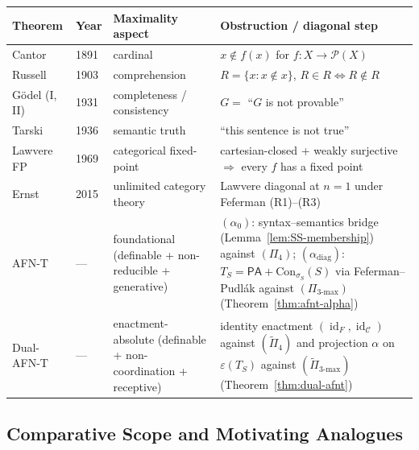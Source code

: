\documentclass[11pt]{article}
\theoremstyle{plain}
\theoremstyle{definition}
\newcommand{\cC}{\mathcal{C}}
\newcommand{\cP}{\mathcal{P}}
\newcommand{\Con}{\mathrm{Con}}
\newcommand{\PA}{\mathsf{PA}}
\DeclareMathOperator{\id}{id}
\begin{document}
\begin{center}
\begin{tabular}{@{}l l p{3.2cm} p{5.7cm}@{}}
\toprule
Theorem & Year & Maximality aspect & Obstruction / diagonal step \\ \midrule
Cantor~\cite{Cantor1891} & 1891 & cardinal & $x \notin f(x)$ for $f : X \to \cP(X)$ \\
Russell~\cite{Russell1903} & 1903 & comprehension & $R = \{x : x \notin x\}$, $R \in R \iff R \notin R$ \\
G\"odel (I, II)~\cite{Godel1931} & 1931 & completeness / consistency & $G = $ ``$G$ is not provable'' \\
Tarski~\cite{Tarski1936} & 1936 & semantic truth & ``this sentence is not true'' \\
Lawvere FP~\cite{Lawvere1969} & 1969 & categorical fixed-point & cartesian-closed + weakly surjective $\Rightarrow$ every $f$ has a fixed point \\
Ernst~\cite{Ernst2015} & 2015 & unlimited category theory & Lawvere diagonal at $n = 1$ under Feferman (R1)--(R3) \\
AFN-T & --- & foundational (definable + non-reducible + generative) & $(\alpha_0)$: syntax--semantics bridge (Lemma~\ref{lem:SS-membership}) against $(\Pi_4)$; $(\alpha_{\mathrm{diag}})$: $T_S = \PA + \Con_{\sigma_S}(S)$ via Feferman--Pudl\'ak against $(\Pi_{3\text{-max}})$ (Theorem~\ref{thm:afnt-alpha}) \\
Dual-AFN-T & --- & enactment-absolute (definable + non-coordination + receptive) & identity enactment $(\id_F, \id_\cC)$ against $(\tilde{\Pi}_4)$ and projection $\alpha$ on $\varepsilon(T_S)$ against $(\tilde{\Pi}_{3\text{-max}})$ (Theorem~\ref{thm:dual-afnt}) \\
\bottomrule
\end{tabular}
\end{center}

\subsection{Comparative Scope and Motivating Analogues}
\end{document}
